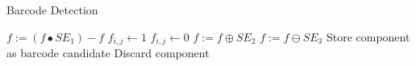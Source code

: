 \documentclass[runningheads,a4paper]{llncs}
\begin{document}
\begin{algorithm}
\caption{Barcode Detection}\label{euclid}
\begin{algorithmic}[1]
\State $f := (f \bullet SE_1) - f$
\State $f_{i,j} \leftarrow 1$
\Else
\State $f_{i,j} \leftarrow 0$
\EndIf
\EndFor
\State $f := f \oplus SE_2$
\State $f := f \ominus SE_3$
\State Store component as barcode candidate
\Else
\State Discard component
\EndIf
\EndFor
\EndProcedure
\end{algorithmic}
\label{alg:detection}
\end{algorithm}



\end{document}
